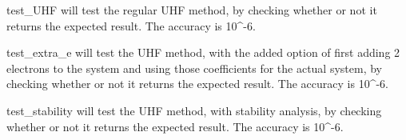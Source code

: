 \documentclass[letterpaper,10pt,english]{sphinxmanual}
\begin{document}

\begin{fulllineitems}
\label{\detokenize{tests:ghf.tests.test_auth.test_UHF}}
test\_UHF will test the regular UHF method, by checking whether or not it returns the expected result. The accuracy is 10\textasciicircum{}-6.

\end{fulllineitems}


\begin{fulllineitems}
\label{\detokenize{tests:ghf.tests.test_auth.test_extra_e}}
test\_extra\_e will test the UHF method, with the added option of first adding 2 electrons to the system and using those coefficients
for the actual system, by checking whether or not it returns the expected result. The accuracy is 10\textasciicircum{}-6.

\end{fulllineitems}


\begin{fulllineitems}
\label{\detokenize{tests:ghf.tests.test_auth.test_stability}}
test\_stability will test the UHF method, with stability analysis, by checking whether or not it returns the expected result. The accuracy is 10\textasciicircum{}-6.

\end{fulllineitems}
\end{document}
